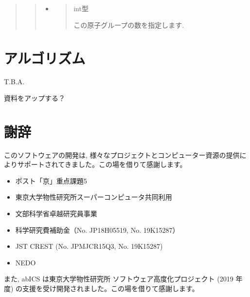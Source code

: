 \documentclass[letterpaper,10pt,dvipdfmx]{sphinxmanual}
\begin{document}
\begin{itemize}
\begin{quote}
\begin{itemize}
\begin{quote}
\begin{itemize}
\item {} 
\begin{quote}

 int型

この原子グループの数を指定します.
\end{quote}

\end{itemize}
\end{quote}

\end{itemize}
\end{quote}

\end{itemize}


\chapter{アルゴリズム}
\label{\detokenize{algorithm/index::doc}}\label{\detokenize{algorithm/index:id1}}
T.B.A.

資料をアップする？


\chapter{謝辞}
\label{\detokenize{acknowledge/index::doc}}\label{\detokenize{acknowledge/index:id1}}
このソフトウェアの開発は, 様々なプロジェクトとコンピューター資源の提供によりサポートされてきました。この場を借りて感謝します。
\begin{itemize}
\item {} 
ポスト「京」重点課題5

\item {} 
東京大学物性研究所スーパーコンピュータ共同利用

\item {} 
文部科学省卓越研究員事業

\item {} 
科学研究費補助金（No. JP18H05519, No. 19K15287）

\item {} 
JST CREST (No. JPMJCR15Q3, No. 19K15287)

\item {} 
NEDO

\end{itemize}

また, abICS は東京大学物性研究所 ソフトウェア高度化プロジェクト (2019 年度) の支援を受け開発されました。この場を借りて感謝します。
\end{document}
